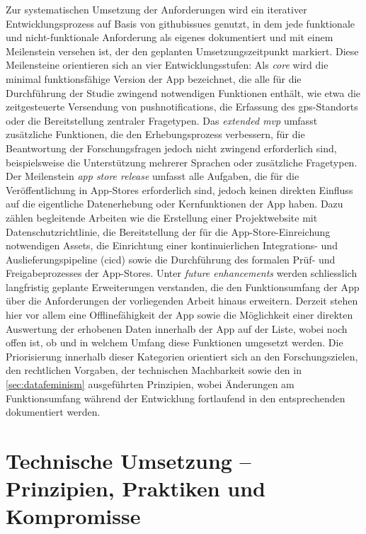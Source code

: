 Zur systematischen Umsetzung der Anforderungen wird ein iterativer Entwicklungsprozess auf Basis von \glspl{githubissue} genutzt, in dem jede funktionale und nicht-funktionale Anforderung als eigenes  dokumentiert und mit einem Meilenstein versehen ist, der den geplanten Umsetzungszeitpunkt markiert. Diese Meilensteine orientieren sich an vier Entwicklungsstufen: Als \textit{core } wird die minimal funktionsfähige Version der App bezeichnet, die alle für die Durchführung der Studie zwingend notwendigen Funktionen enthält, wie etwa die zeitgesteuerte Versendung von \glspl{pushnotification}, die Erfassung des \gls{gps}-Standorts oder die Bereitstellung zentraler Fragetypen. Das \textit{extended \gls{mvp}} umfasst zusätzliche Funktionen, die den Erhebungsprozess verbessern, für die Beantwortung der Forschungsfragen jedoch nicht zwingend erforderlich sind, beispielsweise die Unterstützung mehrerer Sprachen oder zusätzliche Fragetypen. Der Meilenstein \textit{app store release} umfasst alle Aufgaben, die für die Veröffentlichung in App-Stores erforderlich sind, jedoch keinen direkten Einfluss auf die eigentliche Datenerhebung oder Kernfunktionen der App haben. Dazu zählen begleitende Arbeiten wie die Erstellung einer Projektwebsite mit Datenschutzrichtlinie, die Bereitstellung der für die App-Store-Einreichung notwendigen Assets, die Einrichtung einer kontinuierlichen Integrations- und Auslieferungspipeline (\gls{cicd}) sowie die Durchführung des formalen Prüf- und Freigabeprozesses der App-Stores. Unter \textit{future enhancements} werden schliesslich langfristig geplante Erweiterungen verstanden, die den Funktionsumfang der App über die Anforderungen der vorliegenden Arbeit hinaus erweitern. Derzeit stehen hier vor allem eine Offlinefähigkeit der App sowie die Möglichkeit einer direkten Auswertung der erhobenen Daten innerhalb der App auf der Liste, wobei noch offen ist, ob und in welchem Umfang diese Funktionen umgesetzt werden. Die Priorisierung innerhalb dieser Kategorien orientiert sich an den Forschungszielen, den rechtlichen Vorgaben, der technischen Machbarkeit sowie den in \cref{sec:datafeminism} ausgeführten Prinzipien, wobei Änderungen am Funktionsumfang während der Entwicklung fortlaufend in den entsprechenden  dokumentiert werden.


\section{Technische Umsetzung -- Prinzipien, Praktiken und Kompromisse}
\label{sec:app_entwicklung_technische_umsetzung}

